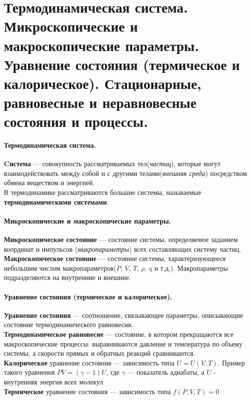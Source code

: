 \section{\normalsize Термодинамическая система. Микроскопические и макроскопические параметры. Уравнение состояния (термическое и калорическое). Стационарные, равновесные и неравновесные состояния и процессы. }
\paragraph{Термодинамическая система.}\textbf{Cистема} --- совокупность рассматриваемых тел(\textit{частиц}), которые могут взаимодействовать между собой и с другими телами(\textit{внешняя среда}) посредством обмена веществом и энергией.\\
В термодинамике рассматриваются большие системы, называемые \textbf{термодинамическими системами}.
\paragraph{Микроскопические и макроскопические параметры.}\textbf{Микроскопическое состояние} --- состояние системы, определяемое заданием координат и импульсов (\textit{микропараметры}) всех составляющих систему частиц.\\
\textbf{Макроскопическое состояние} --- состояние системы, характеризующееся небольшим числом макропараметров($P$, $V$, $T$, $\rho$, $\eta$ и т.д.). Макропараметры подразделяются на внутренние и внешние.
\paragraph{Уравнение состояния (термическое и калорическое).}\textbf{Уравнение состояния} --- соотношение, связывающее параметры, описывающие состояние термодинамического равновесия.\\
\textbf{Термодинамическое равновесие} --- состояние, в котором прекращаются все макроскопические процессы: выравниваются давление и температура по объему системы, а скорости прямых и обратных реакций сравниваются.\\
\textbf{Калорическое} уравнение состояния --- зависимость типа $U = U(V,T)$. Пример такого уравнения $PV = (\gamma - 1)U$, где $\gamma$ --- показатель адиабаты, а $U$ - внутренняя энергия всех молекул\\
\textbf{Термическое} уравнение состояния --- зависимость типа $f(P,V,T)=0$\\

